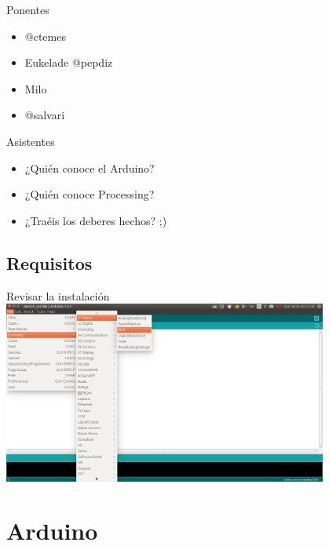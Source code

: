 \documentclass{beamer}
\begin{document}
\begin{frame}{Ponentes}
  \begin{itemize}
  \item @ctemes
  \item Eukelade @pepdiz
  \item Milo
  \item @salvari
  \end{itemize}
\end{frame}

\begin{frame}{Asistentes}
  \begin{itemize}
  \item ¿Quién conoce el Arduino?
    \pause
  \item ¿Quién conoce Processing?
    \pause
  \item ¿Traéis los deberes hechos? ;)
  \end{itemize}
\end{frame}

\subsection{Requisitos}

\begin{frame}{Revisar la instalación}
  \includegraphics [width=0.8\textwidth]{open_blink.png}
\end{frame}

\section{Arduino}
\end{document}
